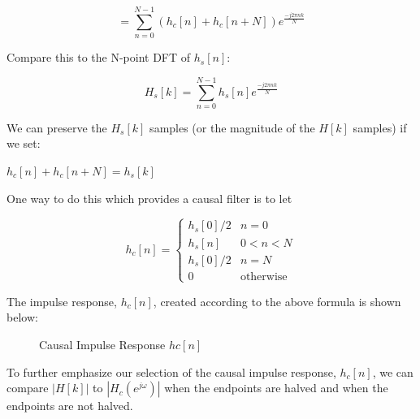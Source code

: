 \documentclass[fleqn]{article}
\begin{document}
\begin{enumerate}
\begin{enumerate}[nolistsep]
			\begin{equation*}
				 = \sum_{n=0}^{N-1}{(h_c[n] + h_c[n+N])e^{\frac{-j2{\pi}nk}{N}}}
			\end{equation*}
			
			Compare this to the N-point DFT of $h_s[n]$:
			
			\begin{equation*}
				H_s[k] = \sum_{n=0}^{N-1}{h_s[n]e^{\frac{-j2{\pi}nk}{N}}}
			\end{equation*}
			
			We can preserve the $H_s[k]$ samples (or the magnitude of the $H[k]$ samples) if we set:
			
			$h_c[n] + h_c[n+N] = h_s[k]$
			
			One way to do this which provides a causal filter is to let
			
			\begin{equation*}
				h_c[n] = \begin{cases}
					h_s[0]/2 & n = 0\\
					h_s[n]   & 0 < n < N\\
					h_s[0]/2 & n = N\\
					0		 & \text{otherwise}
				\end{cases}
			\end{equation*}
			
			The impulse response, $h_c[n]$, created according to the above formula is shown below:
			
			\begin{figure}[H]
				\centerline{}
				\caption{Causal Impulse Response $hc[n]$}
			\end{figure}
			
			To further emphasize our selection of the causal impulse response, $h_c[n]$, we can compare $|H[k]|$ to $|H_c(e^{j\omega})|$ when the endpoints are halved and when the endpoints are not halved.
			

\end{enumerate}
\end{enumerate}
\end{document}
